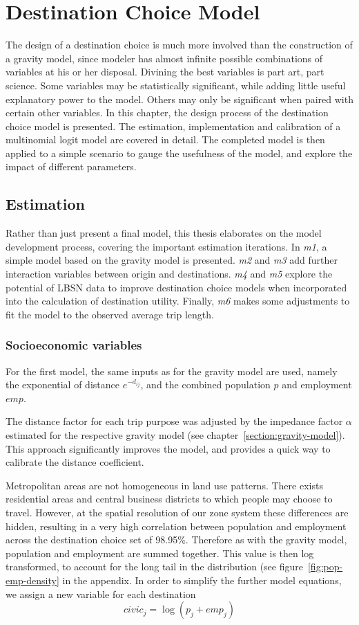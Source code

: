 \chapter{Destination Choice Model}
\label{section:destination-choice}
The design of a destination choice is much more involved than the construction of a gravity model, since modeler has almost infinite possible combinations of variables at his or her disposal. Divining the best variables is part art, part science. Some variables may be statistically significant, while adding little useful explanatory power to the model. Others may only be significant when paired with certain other variables. In this chapter, the design process of the destination choice model is presented. The estimation, implementation and calibration of a multinomial logit model are covered in detail. The completed model is then applied to a simple scenario to gauge the usefulness of the model, and explore the impact of different parameters. 

\section{Estimation}
\label{section:estimation}
Rather than just present a final model, this thesis elaborates on the model development process, covering the important estimation iterations. In \textit{m1}, a simple model based on the gravity model is presented. \textit{m2} and \textit{m3} add further interaction variables between origin and destinations. \textit{m4} and \textit{m5} explore the potential of LBSN data to improve destination choice models when incorporated into the calculation of destination utility. Finally, \textit{m6} makes some adjustments to fit the model to the observed average trip length.

\subsection{Socioeconomic variables}
For the first model, the same inputs as for the gravity model are used, namely the exponential of distance $e^{-d_{ij}}$, and the combined population $p$ and employment $emp$.

The distance factor for each trip purpose was adjusted by the impedance factor $\alpha$ estimated for the respective gravity model (see chapter~\ref{section:gravity-model}). This approach significantly improves the model, and provides a quick way to calibrate the distance coefficient.

Metropolitan areas are not homogeneous in land use patterns. There exists residential areas and central business districts to which people may choose to travel. However, at the spatial resolution of our zone system these differences are hidden, resulting in a very high correlation between population and employment across the destination choice set of 98.95\%. Therefore as with the gravity model, population and employment are summed together. This value is  then log transformed, to account for the long tail in the distribution (see figure~\ref{fig:pop-emp-density} in the appendix. In order to simplify the further model equations, we assign a new variable for each destination
$$ civic_j = \log\left( p_j + emp_j \right) $$

